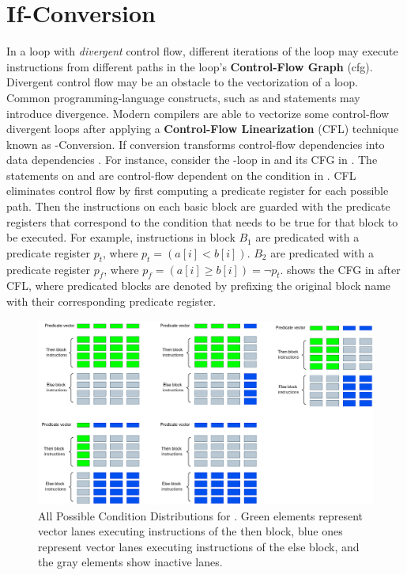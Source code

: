 \section{If-Conversion}
In a loop with \emph{divergent} control flow,  different iterations of the loop may execute instructions from different paths in the loop's \textbf{Control-Flow Graph} (\acrshort{cfg}).
Divergent control flow may be an obstacle to the vectorization of a loop.
Common programming-language constructs, such as  and  statements may introduce divergence.
Modern compilers are able to vectorize some control-flow divergent loops after applying a \textbf{Control-Flow Linearization} (CFL) technique known as -Conversion.
If conversion transforms control-flow dependencies into data dependencies \cite{allen_conversion_1983, park1991ifconversion}.
For instance, consider the -loop in  and its CFG in .
The statements on  and  are control-flow dependent on the condition in .
CFL eliminates control flow by first computing a predicate register for each possible path.
Then the instructions on each basic block are guarded with the predicate registers that correspond to the condition that needs to be true for that block to be executed.
For example, instructions in block $B_1$ are predicated with a predicate register $p_t$, where $p_t = (a[i] < b[i])$.
$B_2$ are predicated with a predicate register $p_f$, where $p_f = (a[i] \geq b[i]) = \neg p_t$.
 shows the CFG in  after CFL, where predicated blocks are denoted by prefixing the original block name with their corresponding predicate register.


\begin{figure}[t]
\includegraphics[width=\textwidth]{Figures/02-background/condition_distribution.png}
\centering

\caption{All Possible Condition Distributions for . Green elements represent vector lanes executing instructions of the then block, blue ones represent vector lanes executing instructions of the else block, and the gray elements show inactive lanes. }
\label{fig:condition-distribution}
\end{figure}


